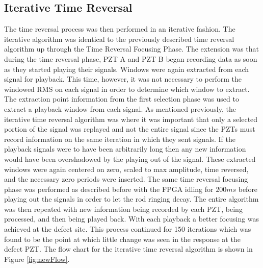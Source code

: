 \subsection{Iterative Time Reversal}
The time reversal process was then  performed in an iterative fashion. The iterative algorithm was identical to the previously described time reversal algorithm up through the Time Reversal Focusing Phase. The extension was that during the time reversal phase, PZT A and PZT B began recording data as soon as they started playing their signals. Windows were again extracted from each signal for playback. This time, however, it was not necessary to perform the windowed RMS on each signal in order to determine which window to extract. The extraction point information from the first selection phase was used to extract a playback window from each signal. As mentioned previously, the iterative time reversal algorithm was where it was important that only a selected portion of the signal was replayed and not the entire signal since the PZTs must record information on the same iteration in which they sent signals. If the playback signals were to have been arbitrarily long then any new information would have been overshadowed by the playing out of the signal. These extracted windows were again centered on zero, scaled to max amplitude, time reversed, and the necessary zero periods were inserted. The same time reversal focusing phase was performed as described before with the FPGA idling for $200 ms$ before playing out the signals in order to let the rod ringing decay. The entire algorithm was then repeated with new information being recorded by each PZT, being processed, and then being played back. With each playback a better focusing was achieved at the defect site. This process continued for 150 iterations which was found to be the point at which little change was seen in the response at the defect PZT. The flow chart for the iterative time reversal algorithm is shown in Figure \ref{fig:newFlow}.

